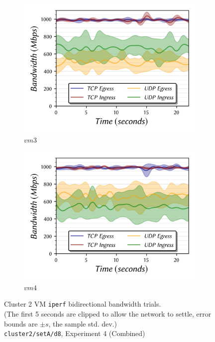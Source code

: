 \documentclass[a4paper,10pt]{article}
\begin{document}
\begin{figure}
\hfill%
\begin{subfigure}{.33\textwidth}
  \centering
  \includegraphics[width=\hsize]{figs/cluster2/setA/vis-5-vm3-combined.png}
  \caption{$vm3$}
  \label{fig:bw-bidir-2:d}
\end{subfigure}%
\begin{subfigure}{.33\textwidth}
  \centering
  \includegraphics[width=\hsize]{figs/cluster2/setA/vis-5-vm4-combined.png}
  \caption{$vm4$}
  \label{fig:bw-bidir-2:e}
\end{subfigure}%
\hspace{0.17\textwidth}


\caption{\centering{} Cluster 2 VM \texttt{iperf} bidirectional bandwidth trials. \\ (The first 5 seconds are clipped to allow the network to settle, error bounds are $\pm s$, the sample std. dev.) \\ \texttt{cluster2/setA/d8}, Experiment 4 (Combined) }
\label{fig:bw-bidir-2}
\end{figure}
\end{document}
